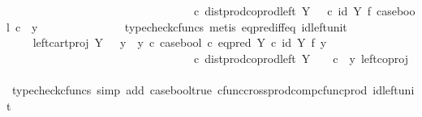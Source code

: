 \begin{isabellebody}
\ \ \ \ \ \ \ \ \ \ \ \ \ \ \ \ \ \ \ \ \ \ \ \ \ \ \ \ \ \ \ \ \ {\isasymcirc}\isactrlsub c\ dist{\isacharunderscore}{\kern0pt}prod{\isacharunderscore}{\kern0pt}coprod{\isacharunderscore}{\kern0pt}left\ Y\ {\isasymone}\ {\isasymone}\ {\isasymcirc}\isactrlsub c\ {\isacharparenleft}{\kern0pt}id\ Y\ {\isasymtimes}\isactrlsub f\ case{\isacharunderscore}{\kern0pt}bool{\isacharparenright}{\kern0pt}\ {\isasymcirc}\isactrlsub c\ \ {\isasymlangle}y{\isacharcomma}{\kern0pt}\ {\isasymt}{\isasymrangle}{\isachardoublequoteclose}\isanewline
\ \ \ \ \ \ \ \ \ \ \ \ \isamarkupfalse%
\ {\isacharparenleft}{\kern0pt}typecheck{\isacharunderscore}{\kern0pt}cfuncs{\isacharcomma}{\kern0pt}\ metis\ eq{\isacharunderscore}{\kern0pt}pred{\isacharunderscore}{\kern0pt}iff{\isacharunderscore}{\kern0pt}eq\ id{\isacharunderscore}{\kern0pt}left{\isacharunderscore}{\kern0pt}unit{}{\isacharparenright}{\kern0pt}\isanewline
\ \ \ \ \ \ \ \ \ \ \isamarkupfalse%
\ \isamarkupfalse%
\ {\isachardoublequoteopen}{\isachardot}{\kern0pt}{\isachardot}{\kern0pt}{\isachardot}{\kern0pt}\ {\isacharequal}{\kern0pt}\ {\isacharparenleft}{\kern0pt}left{\isacharunderscore}{\kern0pt}cart{\isacharunderscore}{\kern0pt}proj\ Y\ {\isasymone}\ {\isasymamalg}\ {\isacharparenleft}{\kern0pt}{\isacharparenleft}{\kern0pt}y{}\ {\isasymamalg}\ y{}{\isacharparenright}{\kern0pt}\ {\isasymcirc}\isactrlsub c\ case{\isacharunderscore}{\kern0pt}bool\ {\isasymcirc}\isactrlsub c\ eq{\isacharunderscore}{\kern0pt}pred\ Y\ {\isasymcirc}\isactrlsub c\ {\isacharparenleft}{\kern0pt}id\ Y\ {\isasymtimes}\isactrlsub f\ y{}{\isacharparenright}{\kern0pt}{\isacharparenright}{\kern0pt}{\isacharparenright}{\kern0pt}\ \isanewline
\ \ \ \ \ \ \ \ \ \ \ \ \ \ \ \ \ \ \ \ \ \ \ \ \ \ \ \ \ \ \ \ \ {\isasymcirc}\isactrlsub c\ dist{\isacharunderscore}{\kern0pt}prod{\isacharunderscore}{\kern0pt}coprod{\isacharunderscore}{\kern0pt}left\ Y\ {\isasymone}\ {\isasymone}\ \ {\isasymcirc}\isactrlsub c\ \ {\isasymlangle}y{\isacharcomma}{\kern0pt}\ left{\isacharunderscore}{\kern0pt}coproj\ {\isasymone}\ {\isasymone}{\isasymrangle}{\isachardoublequoteclose}\isanewline
\ \ \ \ \ \ \ \ \ \ \ \ \isamarkupfalse%
\ {\isacharparenleft}{\kern0pt}typecheck{\isacharunderscore}{\kern0pt}cfuncs{\isacharcomma}{\kern0pt}\ simp\ add{\isacharcolon}{\kern0pt}\ case{\isacharunderscore}{\kern0pt}bool{\isacharunderscore}{\kern0pt}true\ cfunc{\isacharunderscore}{\kern0pt}cross{\isacharunderscore}{\kern0pt}prod{\isacharunderscore}{\kern0pt}comp{\isacharunderscore}{\kern0pt}cfunc{\isacharunderscore}{\kern0pt}prod\ id{\isacharunderscore}{\kern0pt}left{\isacharunderscore}{\kern0pt}unit{}{\isacharparenright}{\kern0pt}\isanewline

\end{isabellebody}
